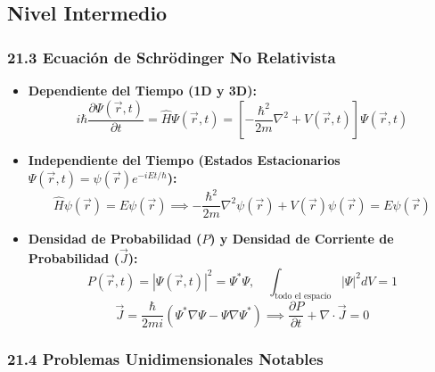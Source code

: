 \documentclass[11pt,a4paper]{article}
\begin{document}
\subsection*{Nivel Intermedio}

\subsubsection*{21.3 Ecuación de Schrödinger No Relativista}

\begin{itemize}
  \item \textbf{Dependiente del Tiempo (1D y 3D):}
  \[
    i\hbar \frac{\partial \Psi(\vec{r}, t)}{\partial t} = \hat{H}\Psi(\vec{r}, t) = \left[ -\frac{\hbar^2}{2m}\nabla^2 + V(\vec{r}, t) \right] \Psi(\vec{r}, t)
  \]
  \item \textbf{Independiente del Tiempo (Estados Estacionarios $\Psi(\vec{r}, t) = \psi(\vec{r})e^{-iEt/\hbar}$):}
  \[
    \hat{H}\psi(\vec{r}) = E\psi(\vec{r}) \implies -\frac{\hbar^2}{2m}\nabla^2\psi(\vec{r}) + V(\vec{r})\psi(\vec{r}) = E\psi(\vec{r})
  \]
  \item \textbf{Densidad de Probabilidad ($P$) y Densidad de Corriente de Probabilidad ($\vec{J}$):}
  \[
    P(\vec{r}, t) = |\Psi(\vec{r}, t)|^2 = \Psi^* \Psi, \quad \int_{\text{todo el espacio}} |\Psi|^2 dV = 1
  \]
  \[
    \vec{J} = \frac{\hbar}{2mi}(\Psi^* \nabla\Psi - \Psi \nabla\Psi^*) \implies \frac{\partial P}{\partial t} + \nabla \cdot \vec{J} = 0
  \]
\end{itemize}

\subsubsection*{21.4 Problemas Unidimensionales Notables}
\end{document}
